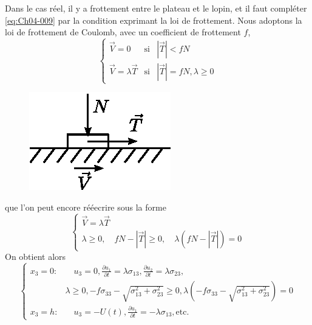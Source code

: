 Dans le cas réel, il y a frottement entre le plateau et le lopin, et il faut compléter \eqref{eq:Ch04-009} par la condition exprimant la loi de frottement. 
Nous adoptons la loi de frottement de Coulomb, avec un coefficient de frottement $f$,
\begin{equation}
    \left\{
    \begin{aligned}
        \vec{V} = 0 & \text{si} & |\vec{T}| < fN \\
        \vec{V} = \lambda \vec{T} & \text{si} & |\vec{T}| = fN, \lambda \geq 0
    \end{aligned}
    \right.
    \label{eq:Ch04-013}
\end{equation}
\begin{figure}
    \begin{center}
        \includegraphics{../images/T1_Ch04-0003}
    \end{center}
\end{figure}

que l'on peut encore rééecrire sous la forme
\begin{equation}
    \left\{
    \begin{aligned}
        \vec{V} = \lambda \vec{T}\\
        \lambda \geq 0, \quad fN - |\vec{T}| \geq 0, \quad \lambda \left( fN - |\vec{T}| \right) = 0
    \end{aligned}\right.
    \label{eq:Ch04-014}
\end{equation}
On obtient alors
\begin{equation}
    \left\{
    \begin{aligned}
        x_3 = 0:&\quad u_3 = 0, \frac{\partial u_1}{\partial t} =\lambda \sigma_{13}, \frac{\partial u_2}{\partial t} = \lambda \sigma_{23}, \\
            & \lambda \geq 0, -f \sigma_{33} - \sqrt{\sigma_{13}^2 + \sigma_{23}^2} \geq 0, \lambda \left( -f \sigma_{33} - \sqrt{\sigma_{13}^2 + \sigma_{23}^2} \right) = 0 \\
        x_3 = h:&\quad u_3 = -U(t), \frac{\partial u_1}{\partial t} = -\lambda \sigma_{13}, \text{etc.}
    \end{aligned}
    \right.
    \label{eq:Ch04-015}
\end{equation}

